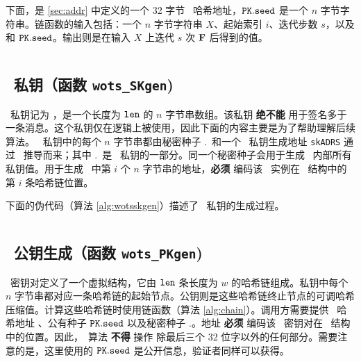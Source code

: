 下面，\ADRS 是 \cref{sec:addr} 中定义的一个 32 字节 \WOTSCS\ 哈希地址，$\pk.\seed$ 是一个 $n$ 字节字符串。链函数的输入包括：一个 $n$ 字节字符串 $X$、起始索引 $i$、迭代步数 $s$，以及 \ADRS 和 $\pk.\seed$。输出则是在输入 $X$ 上迭代 $s$ 次 $\mathbf{F}$ 后得到的值。

\begin{algorithm}
\inputminted[breaklines,linenos,tabsize=2,mathescape,escapeinside=||]{C}{paper/code/chain.cs}
\caption{{\tt chain} --- \WOTSCS\ 中使用的链函数。}
\label{alg:chain}
\end{algorithm}

\subsection{\WOTSCS\ 私钥（函数 \texttt{wots\_SKgen})}

\WOTSCS\ 私钥记为 \sk，是一个长度为 $\mathtt{len}$ 的 $n$ 字节串数组。该私钥 \textbf{绝不能} 用于签名多于一条消息。这个私钥仅在逻辑上被使用，因此下面的内容主要是为了帮助理解后续算法。 \WOTSCS\ 私钥中的每个 $n$ 字节串都由秘密种子 \sk.\seed\ 和一个 \WOTSCS\ 私钥生成地址 \texttt{skADRS} 通过 \PRF\ 推导而来；其中 \sk.\seed\ 是 \SPHINCSA\ 私钥的一部分。同一个秘密种子会用于生成 \SPHINCSA\ 内部所有私钥值。用于生成 \sk\ 中第 $i$ 个 $n$ 字节串的地址，\textbf{必须} 编码该 \WOTSCS\ 实例在 \SPHINCSA\ 结构中的第 $i$ 条哈希链位置。

下面的伪代码（算法 \ref{alg:wotsskgen}）描述了 \WOTSCS\ 私钥的生成过程。

\begin{algorithm}
\inputminted[breaklines,linenos,tabsize=2,mathescape,escapeinside=||]{C}{paper/code/wots_SKgen.cs}
\caption{\texttt{wots\_SKgen} --- 生成 \WOTSCS\ 私钥。}
\label{alg:wotsskgen}
\end{algorithm}

\subsection{\WOTSCS\ 公钥生成（函数 \texttt{wots\_PKgen})}

\WOTSCS\ 密钥对定义了一个虚拟结构，它由 $\mathtt{len}$ 条长度为 $w$ 的哈希链组成。私钥中每个 $n$ 字节串都对应一条哈希链的起始节点。公钥则是这些哈希链终止节点的可调哈希压缩值。计算这些哈希链时使用链函数（算法 \ref{alg:chain}）。调用方需要提供 \WOTSCS\ 哈希地址 \ADRS、公有种子 $\pk.\seed$ 以及秘密种子 \sk.\seed。地址 \ADRS \textbf{必须} 编码该 \WOTSCS\ 密钥对在 \SPHINCSA\ 结构中的位置。因此，\WOTSCS\ 算法 \textbf{不得} 操作 \ADRS 除最后三个 32 位字以外的任何部分。需要注意的是，这里使用的 $\pk.\seed$ 是公开信息，验证者同样可以获得。

